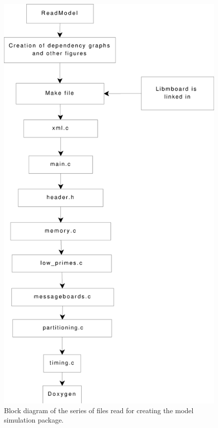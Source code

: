 \begin{figure}[!htb]
\begin{center}
  \includegraphics*[scale=0.35]{xparserblock.eps}
  \caption{Block diagram of the series of files read for
creating the model simulation package.}
  \label{fig:xparserblock}
  \end{center}
\end{figure}



